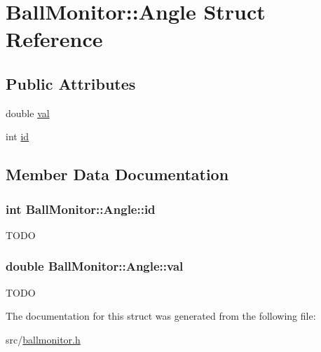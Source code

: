 \hypertarget{structBallMonitor_1_1Angle}{
\section{BallMonitor::Angle Struct Reference}
\label{structBallMonitor_1_1Angle}
}
\subsection*{Public Attributes}
\begin{DoxyCompactItemize}
\item 
double \hyperlink{structBallMonitor_1_1Angle_a78fc53a17705399300e15527aa9797dc}{val}
\item 
int \hyperlink{structBallMonitor_1_1Angle_a8c4cf98ad8b22adcc0bf58bd575185bf}{id}
\end{DoxyCompactItemize}


\subsection{Member Data Documentation}
\hypertarget{structBallMonitor_1_1Angle_a8c4cf98ad8b22adcc0bf58bd575185bf}{
\subsubsection[{id}]{\setlength{\rightskip}{0pt plus 5cm}int {\bf BallMonitor::Angle::id}}}
\label{structBallMonitor_1_1Angle_a8c4cf98ad8b22adcc0bf58bd575185bf}
TODO \hypertarget{structBallMonitor_1_1Angle_a78fc53a17705399300e15527aa9797dc}{
\subsubsection[{val}]{\setlength{\rightskip}{0pt plus 5cm}double {\bf BallMonitor::Angle::val}}}
\label{structBallMonitor_1_1Angle_a78fc53a17705399300e15527aa9797dc}
TODO 

The documentation for this struct was generated from the following file:\begin{DoxyCompactItemize}
\item 
src/\hyperlink{ballmonitor_8h}{ballmonitor.h}\end{DoxyCompactItemize}

